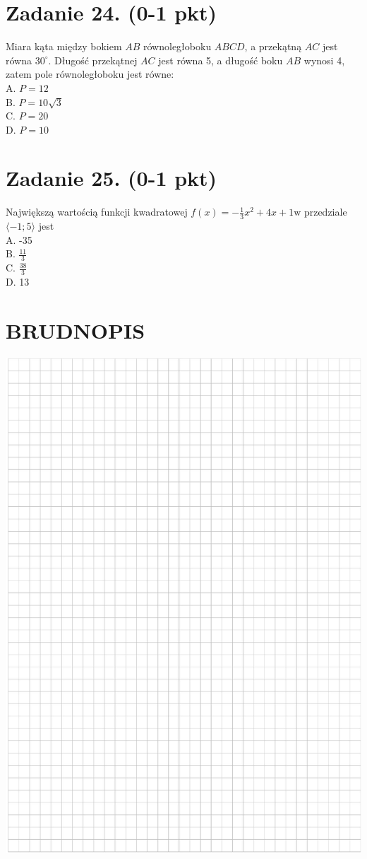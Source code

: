 \documentclass[10pt]{article}
\begin{document}
\section*{Zadanie 24. (0-1 pkt)}
Miara kąta między bokiem \(A B\) równoległoboku \(A B C D\), a przekątną \(A C\) jest równa \(30^{\circ}\). Długość przekątnej \(A C\) jest równa 5, a długość boku \(A B\) wynosi 4, zatem pole równoległoboku jest równe:\\
A. \(P=12\)\\
B. \(P=10 \sqrt{3}\)\\
C. \(P=20\)\\
D. \(P=10\)

\section*{Zadanie 25. (0-1 pkt)}
Największą wartością funkcji kwadratowej \(f(x)=-\frac{1}{3} x^{2}+4 x+1 \mathrm{w}\) przedziale \(\langle-1 ; 5\rangle\) jest\\
A. -35\\
B. \(\frac{11}{3}\)\\
C. \(\frac{38}{3}\)\\
D. 13

\section*{BRUDNOPIS}
\begin{center}
\includegraphics[max width=\textwidth]{2024_11_21_b8ac5f500a5bbb1b4ec5g-11}
\end{center}
\end{document}
